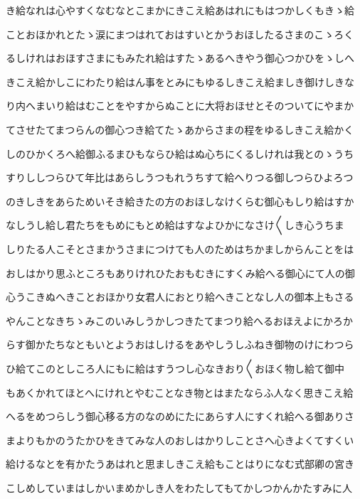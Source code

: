 \documentclass[a4paper,11pt,landscape]{ltjtarticle}
\begin{document}
き給なれは心やすくなむなとこまかにきこえ給あはれにもはつかしくもきゝ給
\par\medskip
ことおほかれとたゝ涙にまつはれておはすいとかうおほしたるさまのこゝろく
\par\medskip
るしけれはおほすさまにもみたれ給はすたゝあるへきやう御心つかひをゝしへ
\par\medskip
きこえ給かしこにわたり給はん事をとみにもゆるしきこえ給ましき御けしきな
\par\medskip
り内へまいり給はむことをやすからぬことに大将おほせとそのついてにやまか
\par\medskip
てさせたてまつらんの御心つき給てたゝあからさまの程をゆるしきこえ給かく
\par\medskip
しのひかくろへ給御ふるまひもならひ給はぬ心ちにくるしけれは我とのゝうち
\par\medskip
すりししつらひて年比はあらしうつもれうちすて給へりつる御しつらひよろつ
\par\medskip
のきしきをあらためいそき給きたの方のおほしなけくらむ御心もしり給はすか
\par\medskip
なしうし給し君たちをもめにもとめ給はすなよひかになさけ〱しき心うちま
\par\medskip
しりたる人こそとさまかうさまにつけても人のためはちかましからんことをは
\par\medskip
おしはかり思ふところもありけれひたおもむきにすくみ給へる御心にて人の御
\par\medskip
心うこきぬへきことおほかり女君人におとり給へきことなし人の御本上もさる
\par\medskip
やんことなきちゝみこのいみしうかしつきたてまつり給へるおほえよにかろか
\par\medskip
らす御かたちなともいとようおはしけるをあやしうしふねき御物のけにわつら
\par\medskip
ひ給てこのとしころ人にもに給はすうつし心なきおり〱おほく物し給て御中
\par\medskip
もあくかれてほとへにけれとやむことなき物とはまたならふ人なく思きこえ給
\par\medskip
へるをめつらしう御心移る方のなのめにたにあらす人にすくれ給へる御ありさ
\par\medskip
まよりもかのうたかひをきてみな人のおしはかりしことさへ心きよくてすくい
\par\medskip
給けるなとを有かたうあはれと思ましきこえ給もことはりになむ式部卿の宮き
\par\medskip
こしめしていまはしかいまめかしき人をわたしてもてかしつかんかたすみに人
\par\medskip
\end{document}
